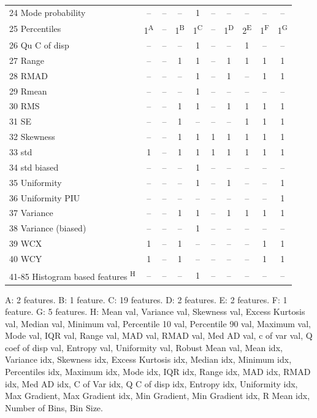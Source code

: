 \documentclass[sn-mathphys,Numbered]{sn-jnl}%
\theoremstyle{thmstyleone}%
\theoremstyle{thmstyletwo}%
\theoremstyle{thmstylethree}%
\begin{document}
\begin{table} [!hbt]
\begin{tiny}
\begin{tabular} { l  c  c  c  c  c  c  c  c  c  }
24 Mode probability & -- & -- & -- & 1 & -- & -- & -- & -- & -- \\
25 Percentiles & 1\textsuperscript{A} & -- & 1\textsuperscript{B} & 1\textsuperscript{C} & -- & 1\textsuperscript{D} & 2\textsuperscript{E} & 1\textsuperscript{F} & 1\textsuperscript{G} \\
26 Qu C of disp & -- & -- &  -- &  1 & -- & -- &  1 & -- & -- \\
27 Range & -- & -- & 1 & 1 & -- & 1 & 1 & 1 & 1 \\
28 RMAD & -- & -- & -- & 1 & -- & 1 & -- & 1 & 1 \\
29 Rmean & -- & -- & -- & 1 & -- & -- & -- & -- & -- \\
30 RMS & -- & -- & 1 & 1 & -- & 1 & 1 & 1 & 1 \\
31 SE & -- & -- & 1 & -- & -- & -- & 1 & 1 & 1 \\
32 Skewness & -- & -- & 1 & 1 & 1 & 1 & 1 & 1 & 1 \\
33 std & 1 & -- & 1 & 1 & 1 & 1 & 1 & 1 & 1 \\
34 std biased & -- & -- & -- & 1 & -- & -- & -- & -- & -- \\
35 Uniformity & -- & -- & -- & 1 & -- & 1 & -- & -- & 1 \\
36 Uniformity PIU & -- & -- & -- & -- & -- & -- & -- & -- & 1 \\
37 Variance & -- & -- & 1 & 1 & -- & 1 & 1 & 1 & 1 \\
38 Variance (biased) & -- & -- & -- & 1 & -- & -- & -- & -- & -- \\
39 WCX & 1 & -- & 1 & -- & -- & -- & -- & 1 & 1 \\
40 WCY & 1 & -- & 1 & -- & -- & -- & -- & 1 & 1 \\
41-85 Histogram based features \textsuperscript{H} & -- & -- & -- & 1 & -- & -- & -- & -- & -- \\

\bottomrule
\end{tabular}
\end{tiny}
\vspace{1ex}
\begin{tiny}
{\raggedright
A: 2 features. B: 1 feature. C: 19 features. D: 2 features. E: 2 features. F: 1 feature. G: 5 features.
H: Mean val, Variance val, Skewness val, Excess Kurtosis val, Median val, Minimum val, Percentile 10 val, Percentile 90 val, Maximum val, Mode val, IQR val, Range val, MAD val, RMAD val, Med AD val, c of var val, Q coef of disp val, Entropy val, Uniformity val, Robust Mean val, Mean idx, Variance idx, Skewness idx, Excess Kurtosis idx, Median idx, Minimum idx, Percentiles idx, Maximum idx, Mode idx, IQR idx, Range idx, MAD idx, RMAD idx, Med AD idx, C of Var idx, Q C of disp idx, Entropy idx, Uniformity idx, Max Gradient, Max Gradient idx, Min Gradient, Min Gradient idx, R Mean idx, Number of Bins, Bin Size.
\par}
\end{tiny}
\end{table}
\end{document}
